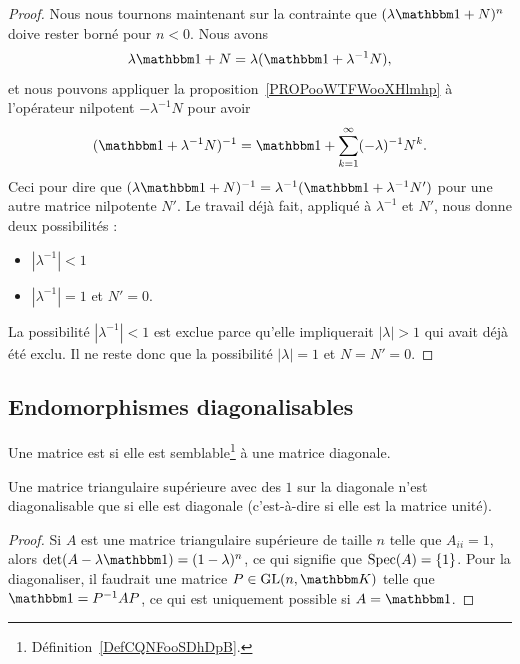 \begin{proof}
    Nous nous tournons maintenant sur la contrainte que \( (\lambda\mtu+N)^n\) doive rester borné pour \( n<0\). Nous avons
    \begin{equation}
        \lambda\mtu+N=\lambda(\mtu+\lambda^{-1}N),
    \end{equation}
    et nous pouvons appliquer la proposition~\ref{PROPooWTFWooXHlmhp} à l'opérateur nilpotent \( -\lambda^{-1} N\) pour avoir
    \begin{equation}
        (\mtu+\lambda^{-1}N)^{-1}=\mtu+\sum_{k=1}^{\infty}(-\lambda)^{-1}N^k.
    \end{equation}
    Ceci pour dire que \( (\lambda\mtu+N)^{-1}=\lambda^{-1}(\mtu+\lambda^{-1}N')\) pour une autre matrice nilpotente \( N'\). Le travail déjà fait, appliqué à \( \lambda^{-1}\) et \( N'\), nous donne deux possibilités :
    \begin{itemize}
        \item \( | \lambda^{-1} |<1\)
        \item \( | \lambda^{-1} |=1\) et \( N'=0\).
    \end{itemize}
    La possibilité \( | \lambda^{-1} |<1\) est exclue parce qu'elle impliquerait \( | \lambda |>1\) qui avait déjà été exclu. Il ne reste donc que la possibilité \( | \lambda |=1\) et \( N=N'=0\).
\end{proof}

\subsection{Endomorphismes diagonalisables}

\begin{definition}  \label{DefCNJqsmo}
    Une matrice est  si elle est semblable\footnote{Définition~\ref{DefCQNFooSDhDpB}.} à une matrice diagonale.
\end{definition}

\begin{lemma}
    Une matrice triangulaire supérieure avec des \( 1\) sur la diagonale n'est diagonalisable que si elle est diagonale (c'est-à-dire si elle est la matrice unité).
\end{lemma}

\begin{proof}
    Si \( A\) est une matrice triangulaire supérieure de taille \( n\) telle que \( A_{ii}=1\), alors \( \det(A-\lambda\mtu)=(1-\lambda)^n\), ce qui signifie que \( \operatorname{Spec}(A)=\{ 1 \}\). Pour la diagonaliser, il faudrait une matrice \( P\in\GL(n,\eK)\) telle que \( \mtu=P^{-1}AP\), ce qui est uniquement possible si \( A=\mtu\).
\end{proof}

